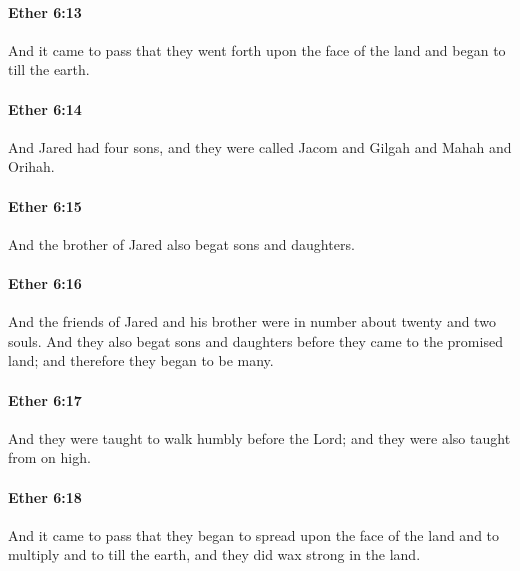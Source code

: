 		\paragraph{Ether 6:13} %
			\label{ETHER-6-13}

			And it came to pass that they went forth upon the face of the land
			and began to till the earth.

		\paragraph{Ether 6:14} %
			\label{ETHER-6-14}

			And Jared had four sons,
			and they were called Jacom and Gilgah and Mahah and Orihah.

		\paragraph{Ether 6:15} %
			\label{ETHER-6-15}

			And the brother of Jared also begat sons and daughters.

		\paragraph{Ether 6:16} %
			\label{ETHER-6-16}

			And the friends of Jared and his brother
			were in number about twenty and two souls.
			And they also begat sons and daughters before they came to the promised land;
			and therefore they began to be many.

		\paragraph{Ether 6:17} %
			\label{ETHER-6-17}

			And they were taught to walk humbly before the Lord;
			and they were also taught from on high.

		\paragraph{Ether 6:18} %
			\label{ETHER-6-18}

			And it came to pass that they began to spread upon the face of the land
			and to multiply and to till the earth,
			and they did wax strong in the land.

